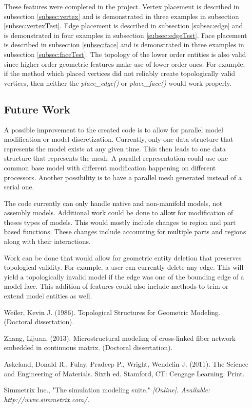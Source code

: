 \documentclass[a4paper, 12pt]{article}
\begin{document}
These features were completed in the project.
Vertex placement is described in subsection \ref{subsec:vertex}
and is demonstrated in three examples in subsection \ref{subsec:vertexTest}.
Edge placement is described in subsection \ref{subsec:edge}
and is demonstrated in four examples in subsection \ref{subsec:edgeTest}.
Face placement is described in subsection \ref{subsec:face}
and is demonstrated in three examples in subsection \ref{subsec:faceTest}.
The topology of the lower order entities is also valid since 
higher order geometric features make use of lower order ones.
For example, if the method which placed vertices did not reliably create
topologically valid vertices, then neither the \emph{place\_edge()} or 
\emph{place\_face()} would work properly. 

\subsection{Future Work} \label{subsec:future}
A possible improvement to the created code is to allow for parallel 
model modification or model discretization. Currently, only one
data structure that represents the model exists at any given time. 
This then leads to one data structure that represents the mesh. 
A parallel representation could use one common base model 
with different modification happening on different processors. 
Another possibility is to have a parallel mesh generated 
instead of a serial one.

The code currently can only handle native and non-manifold models, 
not assembly models. Additional work could be done to allow
for modification of theses types of models. This would mostly
include changes to region and part based functions. These changes 
include accounting for multiple parts and regions along with 
their interactions.

Work can be done that would allow for geometric entity deletion
that preserves topological validity. For example, a user can 
currently delete any edge. This will yield a topologically 
invalid model if the edge was one of the bounding edge of a 
model face. This addition of features could also
include methods to trim or extend model entities as well. 

\newpage
\begin{thebibliography}{99}

Weiler, Kevin J.
(1986).
Topological Structures for Geometric Modeling.
(Doctoral dissertation).

Zhang, Lijuan.
(2013).
Microstructural modeling of cross-linked fiber network embedded in continuous matrix.
(Doctoral dissertation).

Askeland, Donald R., Fulay, Pradeep P., Wright, Wendelin J.
(2011).
The Science and Engineering of Materials.
Sixth ed.
Stamford, CT: Cengage Learning.
Print.

Simmetrix Inc., 
"The simulation modeling suite."
\textit{[Online]. Available: http://www.simmetrix.com/.}

\end{thebibliography}
\end{document}
